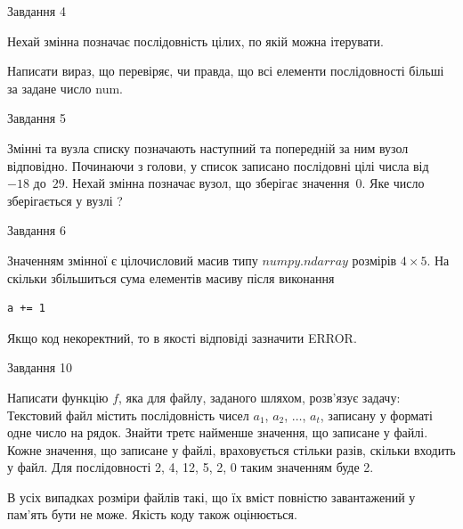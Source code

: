 \documentclass[12pt, ukrainian]{article}
\begin{document}
{               
{\begin{center}Завдання {4}\end{center}}
\vspace{-6mm}
Нехай змінна  позначає послідовність цілих, по якій можна ітерувати.

Написати вираз, що перевіряє, чи правда, що всі елементи послідовності більші за задане число num.\par

\vspace{10mm}
               
{\begin{center}Завдання {5}\end{center}}
\vspace{-6mm}
Змінні  та  вузла списку позначають наступний та попередній за ним вузол відповідно. Починаючи з голови, у список записано послідовні цілі числа від~$-18$ до~$29$. Нехай змінна  позначає вузол, що зберігає значення~$0$.
Яке число зберігається у вузлі  ?\par

               
{\begin{center}Завдання {6}\end{center}}
\vspace{-6mm}
Значенням змінної  є цілочисловий масив типу $numpy.ndarray$ розмірів $4{\times}5$. На скільки збільшиться сума елементів масиву  після виконання
\begin{verbatim}
a += 1
\end{verbatim}


Якщо код некоректний, то в якості відповіді зазначити ERROR.\par

               
{\begin{center}Завдання {10}\end{center}}
\vspace{-6mm}

Написати функцію $f$, яка для файлу, заданого шляхом, розв’язує задачу:\\ Текстовий файл містить послідовність чисел $a_1$, $a_2$, $\ldots$, $a_t$, записану у форматі одне число на рядок. Знайти третє найменше значення, що записане у файлі. Кожне значення, що записане у файлі, враховується стільки разів, скільки входить у файл. Для послідовності 2, 4, 12, 5, 2, 0 таким значенням буде 2.

В усіх випадках розміри файлів такі, що їх вміст повністю завантажений у пам'ять бути не може. Якість коду також оцінюється.



}
\end{document}
